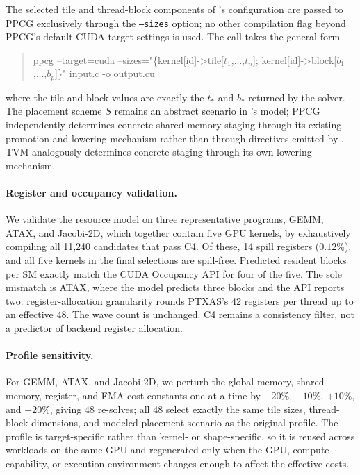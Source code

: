 The selected tile and thread-block components of \name's configuration are passed to PPCG exclusively through the \texttt{--sizes} option; no other compilation flag beyond PPCG's default CUDA target settings is used. The call takes the general form
\begin{quote}
\ttfamily\footnotesize
ppcg --target=cuda --sizes="\{kernel[id]->tile[$t_1$,...,$t_n$]; kernel[id]->block[$b_1$,...,$b_p$]\}" input.c -o output.cu
\end{quote}
where the tile and block values are exactly the \(t_*\) and \(b_*\) returned by the solver. The placement scheme \(S\) remains an abstract scenario in \name's model; PPCG independently determines concrete shared-memory staging through its existing promotion and lowering mechanism rather than through directives emitted by \name. TVM analogously determines concrete staging through its own lowering mechanism.

\paragraph{Register and occupancy validation.}
We validate the resource model on three representative programs, GEMM, ATAX, and Jacobi-2D, which together contain five GPU kernels, by exhaustively compiling all 11,240 candidates that pass C4. Of these, 14 spill registers (\(0.12\%\)), and all five kernels in the final \name selections are spill-free. Predicted resident blocks per SM exactly match the CUDA Occupancy API for four of the five. The sole mismatch is ATAX, where the model predicts three blocks and the API reports two: register-allocation granularity rounds PTXAS's 42 registers per thread up to an effective 48. The wave count is unchanged. C4 remains a consistency filter, not a predictor of backend register allocation.

\paragraph{Profile sensitivity.}
For GEMM, ATAX, and Jacobi-2D, we perturb the global-memory, shared-memory, register, and FMA cost constants one at a time by \(-20\%\), \(-10\%\), \(+10\%\), and \(+20\%\), giving 48 re-solves; all 48 select exactly the same tile sizes, thread-block dimensions, and modeled placement scenario as the original profile. The profile is target-specific rather than kernel- or shape-specific, so it is reused across workloads on the same GPU and regenerated only when the GPU, compute capability, or execution environment changes enough to affect the effective costs.

